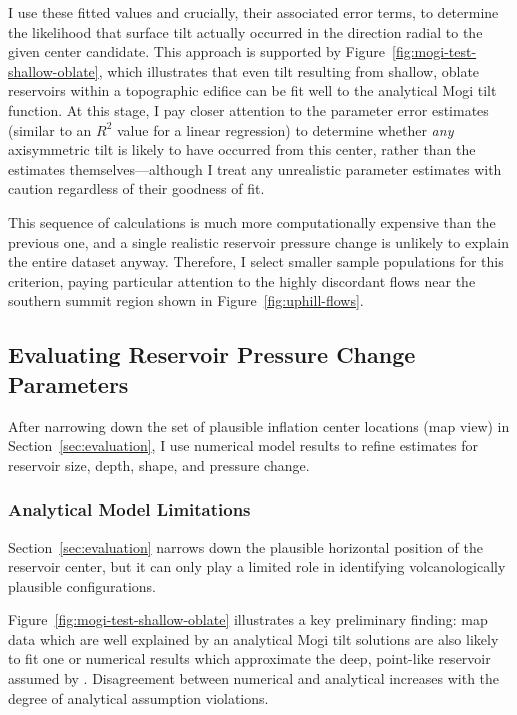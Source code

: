 I use these fitted values and crucially, their associated error terms, to determine the likelihood that surface tilt actually occurred in the direction radial to the given center candidate. This approach is supported by Figure~\ref{fig:mogi-test-shallow-oblate}, which illustrates that even tilt resulting from shallow, oblate reservoirs within a topographic edifice can be fit well to the analytical Mogi tilt function. At this stage, I pay closer attention to the parameter error estimates (similar to an $R^2$ value for a linear regression) to determine whether \emph{any} axisymmetric tilt is likely to have occurred from this center, rather than the estimates themselves---although I treat any unrealistic parameter estimates with caution regardless of their goodness of fit.

This sequence of calculations is much more computationally expensive than the previous one, and a single realistic reservoir pressure change is unlikely to explain the entire dataset anyway. Therefore, I select smaller sample populations for this criterion, paying particular attention to the highly discordant flows near the southern summit region shown in Figure~\ref{fig:uphill-flows}.

\subsection{Evaluating Reservoir Pressure Change Parameters}

After narrowing down the set of plausible inflation center locations (map view) in Section~\ref{sec:evaluation}, I use numerical model results to refine estimates for reservoir size, depth, shape, and pressure change.

\subsubsection{Analytical Model Limitations}

Section~\ref{sec:evaluation} narrows down the plausible horizontal position of the reservoir center, but it can only play a limited role in identifying volcanologically plausible configurations.

Figure~\ref{fig:mogi-test-shallow-oblate} illustrates a key preliminary finding: map data which are well explained by an analytical Mogi tilt solutions are also likely to fit one or numerical results which approximate the deep, point-like reservoir assumed by \textcite{mogi_relations_1958}. Disagreement between numerical and analytical increases with the degree of analytical assumption violations.


